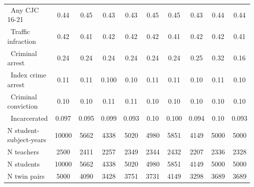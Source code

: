 {\begin{tabular}{l*{9}{c}}
\ Any CJC 16-21&        0.44&        0.45&        0.43&        0.43&        0.45&        0.45&        0.43&        0.44&        0.44\\
\ Traffic infraction&        0.42&        0.41&        0.42&        0.42&        0.42&        0.41&        0.42&        0.42&        0.41\\
\ Criminal arrest&        0.24&        0.24&        0.24&        0.24&        0.24&        0.24&        0.25&        0.32&        0.16\\
\ Index crime arrest&        0.11&        0.11&       0.100&        0.10&        0.11&        0.11&        0.10&        0.11&        0.10\\
\ Criminal conviction&        0.10&        0.10&        0.11&        0.11&        0.10&        0.10&        0.10&        0.10&        0.10\\
\ Incarcerated&       0.097&       0.095&       0.099&       0.093&        0.10&       0.100&       0.094&        0.10&       0.093\\
\hline
N student-subject-years&       10000&        5662&        4338&        5020&        4980&        5851&        4149&        5000&        5000\\
N teachers  &        2500&        2411&        2257&        2349&        2344&        2432&        2207&        2336&        2328\\
N students  &       10000&        5662&        4338&        5020&        4980&        5851&        4149&        5000&        5000\\
N twin pairs&        5000&        4090&        3428&        3751&        3731&        4149&        3298&        3689&        3689\\
\hline\hline
\end{tabular}
}
